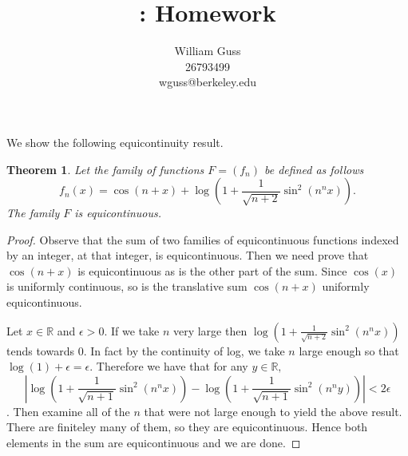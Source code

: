 \documentclass[letter]{article}
\title{\bCLASS: Homework \bHWN}
\author{William Guss\\26793499\\wguss@berkeley.edu}
\newtheorem{theorem}{Theorem}
\newenvironment{menumerate}{%
  \edef\backupindent{\the\parindent}%
  \enumerate%
  \setlength{\parindent}{\backupindent}%
}{\endenumerate}
\begin{document}
\maketitle
\thispagestyle{empty}


\begin{menumerate}
	\setcounter{enumi}{7}
	\item We show the following equicontinuity result.
	\begin{theorem} Let the family of functions $F = (f_n)$ be defined as follows
		$$f_n(x)=\cos(n+x)+\log\left(1+\frac{1}{\sqrt{n+2} }\sin^2(n^nx)\right).$$
		The family $F$ is equicontinuous.
	\end{theorem}
	\begin{proof}
		Observe that the sum of two families of equicontinuous functions indexed by an integer, at that integer, is equicontinuous. Then
		we need prove that $\cos(n+x)$ is equicontinuous as is the other part of the sum. Since $\cos(x)$ is uniformly continuous, so is the
		translative sum $\cos(n+x)$ uniformly equicontinuous.

		Let $x\in \mathbb{R}$ and $\epsilon > 0$. If we take $n$ very large then $\log\left(1+\frac{1}{\sqrt{n+2} }\sin^2(n^nx)\right)$ tends towards $0.$
		In fact by the continuity of log, we take $n$ large enough so that $\log(1) + \epsilon = \epsilon.$ Therefore we have that
		for any $y \in \mathbb{R} ,$
		$$\left|\log\left(1+\frac{1}{\sqrt{n+1}}\sin^2(n^nx)\right)-\log\left(1+\frac{1}{\sqrt{n+1}}\sin^2(n^ny)\right)\right|<2\epsilon$$.
		Then examine all of the $n$ that were not large enough to yield the above result. There are finiteley many of them, so they are equicontinuous.
		Hence both elements in the sum are equicontinuous and we are done.

	\end{proof}
	

\end{menumerate}
\end{document}
